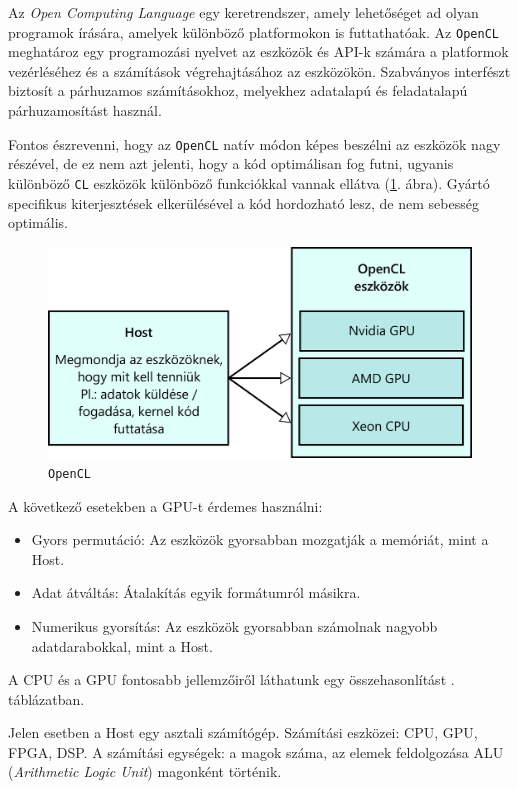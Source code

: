 
Az \textit{Open Computing Language} egy keretrendszer, amely lehetőséget ad olyan programok írására, amelyek különböző platformokon is futtathatóak.
Az \texttt{OpenCL} meghatároz egy programozási nyelvet az eszközök és API-k számára a platformok vezérléséhez és a számítások végrehajtásához az eszközökön. Szabványos interfészt biztosít a párhuzamos számításokhoz, melyekhez adatalapú és feladatalapú párhuzamosítást használ.

Fontos észrevenni, hogy az \texttt{OpenCL} natív módon képes beszélni az eszközök nagy részével, de ez nem azt jelenti, hogy a kód optimálisan fog futni, ugyanis különböző \texttt{CL} eszközök különböző funkciókkal vannak ellátva (\ref{fig:opencl}. ábra). Gyártó specifikus kiterjesztések elkerülésével a kód hordozható lesz, de nem sebesség optimális.

\begin{figure}[h!]
\centering
\includegraphics[width=12cm]{images/opencl.png}
\caption{\texttt{OpenCL}}
\label{fig:opencl}
\end{figure}

A következő esetekben a GPU-t érdemes használni:
\begin{itemize}
\item Gyors permutáció: Az eszközök gyorsabban mozgatják a memóriát, mint a Host.
\item Adat átváltás: Átalakítás egyik formátumról másikra.
\item Numerikus gyorsítás: Az eszközök gyorsabban számolnak nagyobb adatdarabokkal, mint a Host.
\end{itemize}
A CPU és a GPU fontosabb jellemzőiről láthatunk egy összehasonlítást . táblázatban.

Jelen esetben a Host egy asztali számítógép.
Számítási eszközei: CPU, GPU, FPGA, DSP.
A számítási egységek: a magok száma, az elemek feldolgozása ALU (\textit{Arithmetic Logic Unit}) magonként történik.

